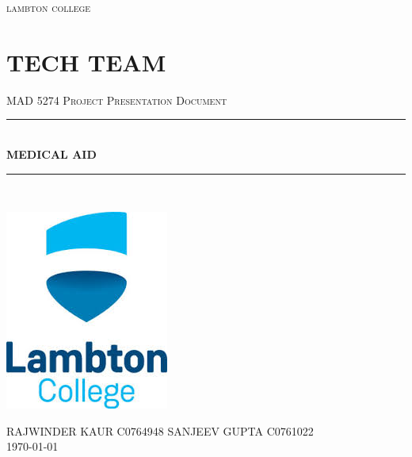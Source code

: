 \documentclass[12pt]{article}
\begin{document}
\begin{titlepage}

\newcommand{\HRule}{\rule{\linewidth}{0.5mm}} %

\center %
 

\textsc{\LARGE lambton college}\\[1.5cm] 
\section * {TECH TEAM}
\textsc{\Large MAD 5274 Project Presentation Document}\\[0.8cm]



\HRule \\[0.4cm]
{ \huge \bfseries MEDICAL AID}\\[0.4cm] %
\HRule \\[1.5cm]
 

\begin{center}
\includegraphics[scale=0.65]{LOGO.jpeg}\\[0.75cm]
\end{center}


\textsc{\Large RAJWINDER KAUR C0764948
\hspace{2.75cm}
SANJEEV GUPTA C0761022}\\[0.75cm]



{\large \today}\\[2.5cm] %

\vfill %

\end{titlepage}
\end{document}
